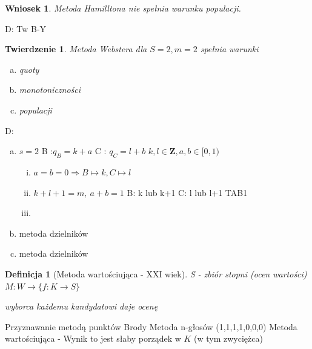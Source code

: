 \documentclass[12pt,a4paper]{article}
\theoremstyle{break}
\newtheorem{definition}{Definicja}[section]
\newtheorem{theorem}{Twierdzenie}[section]
\newtheorem{wniosek}{Wniosek}[theorem]
\begin{document}
	\begin{wniosek}
		Metoda Hamilltona nie spełnia warunku populacji.
	\end{wniosek}
	D: Tw B-Y
	
	\begin{theorem}
		Metoda Webstera dla $S=2, m=2$ spełnia warunki
		\begin{enumerate}[a)]
			\item quoty
			\item monotoniczności
			\item populacji
		\end{enumerate}
	\end{theorem}
	D: \begin{enumerate}[a)]
		\item $s=2$
		B :$q_B=k+a$
		C : $q_C=l+b$
		$k,l \in \mathbf{Z}, a,b\in [0,1)$
		\begin{enumerate}[i)]
			\item $a = b = 0 \Rightarrow B\mapsto k, C\mapsto l$
			\item $k+l+1=m,\: a +b =1$ 
			B: k lub k+1
			C: l lub l+1
			TAB1
			\item 
		\end{enumerate}
		\item metoda dzielników
		\item metoda dzielników
	\end{enumerate}
	
	\begin{definition}[Metoda wartościująca - XXI wiek]
		S - zbiór stopni  (ocen wartości)
		$M:W\rightarrow \{ f: K\rightarrow S\}$
		
		wyborca każdemu kandydatowi daje ocenę
	\end{definition}
	Przyznawanie metodą punktów Brody
	Metoda n-głosów (1,1,1,1,0,0,0)
	Metoda wartościująca - Wynik to jest słaby porządek w $K$ (w tym zwyciężca)
	
\end{document}
